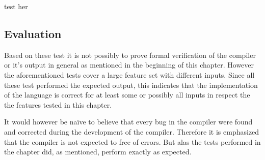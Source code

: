 test her

\subsection*{Evaluation}
Based on these test it is not possibly to prove formal verification of the compiler or it's output in general as mentioned in the beginning of this chapter.
However the aforementioned tests cover a large feature set with different inputs.
Since all these test performed the expected output, this indicates that the implementation of the language is correct for at least some or possibly all inputs in respect the the features tested in this chapter.

It would however be naïve to believe that every bug in the compiler were found and corrected during the development of the compiler.%
Therefore it is emphasized that the compiler is not expected to free of errors. %
But alas the tests performed in the chapter did, as mentioned, perform exactly as expected. 